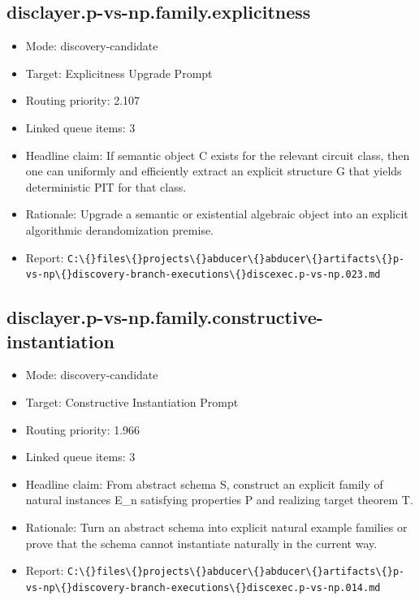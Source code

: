 \documentclass[11pt]{article}
\begin{document}
\subsection*{disclayer.p-vs-np.family.explicitness}
\begin{itemize}
\item Mode: discovery-candidate
\item Target: Explicitness Upgrade Prompt
\item Routing priority: 2.107
\item Linked queue items: 3
\item Headline claim: If semantic object C exists for the relevant circuit class, then one can uniformly and efficiently extract an explicit structure G that yields deterministic PIT for that class.
\item Rationale: Upgrade a semantic or existential algebraic object into an explicit algorithmic derandomization premise.
\item Report: \texttt{C:\textbackslash\{\}files\textbackslash\{\}projects\textbackslash\{\}abducer\textbackslash\{\}abducer\textbackslash\{\}artifacts\textbackslash\{\}p-vs-np\textbackslash\{\}discovery-branch-executions\textbackslash\{\}discexec.p-vs-np.023.md}
\end{itemize}

\subsection*{disclayer.p-vs-np.family.constructive-instantiation}
\begin{itemize}
\item Mode: discovery-candidate
\item Target: Constructive Instantiation Prompt
\item Routing priority: 1.966
\item Linked queue items: 3
\item Headline claim: From abstract schema S, construct an explicit family of natural instances E\_n satisfying properties P and realizing target theorem T.
\item Rationale: Turn an abstract schema into explicit natural example families or prove that the schema cannot instantiate naturally in the current way.
\item Report: \texttt{C:\textbackslash\{\}files\textbackslash\{\}projects\textbackslash\{\}abducer\textbackslash\{\}abducer\textbackslash\{\}artifacts\textbackslash\{\}p-vs-np\textbackslash\{\}discovery-branch-executions\textbackslash\{\}discexec.p-vs-np.014.md}
\end{itemize}
\end{document}
